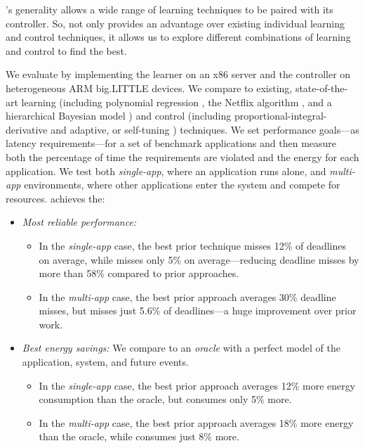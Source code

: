 \SYSTEM{}'s generality allows a wide range of learning techniques to
be paired with its controller.  So, \SYSTEM{} not only provides an
advantage over existing individual learning and control techniques, it
allows us to explore different combinations of learning and control to
find the best.

We evaluate \SYSTEM{} by implementing the learner on an x86 server and
the controller on heterogeneous ARM big.LITTLE devices.  We compare
\SYSTEM{} to existing, state-of-the-art learning (including polynomial
regression \cite{Koala,dubach2010}, the Netflix algorithm
\cite{netflix,Paragon}, and a hierarchical Bayesian model \cite{LEO})
and control (including proportional-integral-derivative
\cite{Hellerstein2004a} and adaptive, or self-tuning
\cite{HandbookControl}) techniques.    We set performance
goals---as latency requirements---for a set of benchmark applications
and then measure both the percentage of time the requirements are
violated and the energy for each application.  We test both
\emph{single-app}, where an application runs alone, and
\emph{multi-app} environments, where other applications enter the
system and compete for resources.  \SYSTEM{} achieves the:
\begin{itemize}[leftmargin=1em]
\item \textit{Most reliable performance:}
  \begin{itemize}[leftmargin=1em]
  \item In the \emph{single-app} case, the best prior technique misses
    12\% of deadlines on average, while \SYSTEM{} misses only 5\% on
    average---reducing deadline misses by more than 58\% compared to
    prior approaches.
  \item In the \emph{multi-app} case, the best prior approach averages
    30\% deadline misses, but \SYSTEM{} misses just 5.6\% of
    deadlines---a huge improvement over prior work.
  \end{itemize}
\item \textit{Best energy savings:} We compare to an \emph{oracle}
  with a perfect model of the application, system, and future events.
  \begin{itemize}[leftmargin=1em]
  \item In the \emph{single-app} case, the best prior approach
    averages 12\% more energy consumption than the oracle, but
    \SYSTEM{} consumes only 5\% more.
  \item In the \emph{multi-app} case, the best prior approach averages
    18\% more energy than the oracle, while \SYSTEM{} consumes just
    8\% more.
  \end{itemize}
\end{itemize}

